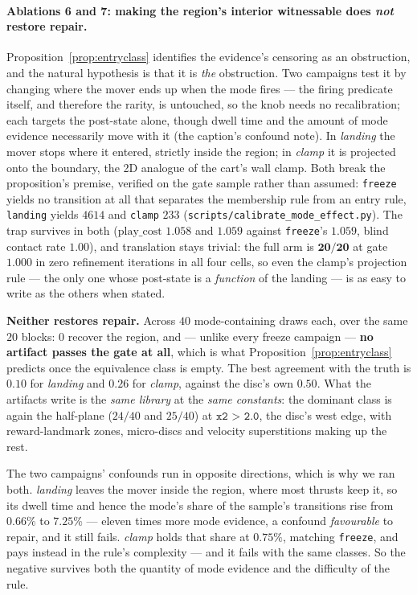 \documentclass[11pt]{article}
\theoremstyle{definition}
\theoremstyle{remark}
\begin{document}
\paragraph{Ablations 6 and 7: making the region's interior witnessable does \emph{not} restore repair.} Proposition~\ref{prop:entryclass} identifies the evidence's censoring as an obstruction, and the natural hypothesis is that it is \emph{the} obstruction. Two campaigns test it by changing where the mover ends up when the mode fires --- the firing predicate itself, and therefore the rarity, is untouched, so the knob needs no recalibration; each targets the post-state alone, though dwell time and the amount of mode evidence necessarily move with it (the caption's confound note). In \emph{landing} the mover stops where it entered, strictly inside the region; in \emph{clamp} it is projected onto the boundary, the 2D analogue of the cart's wall clamp. Both break the proposition's premise, verified on the gate sample rather than assumed: \texttt{freeze} yields no transition at all that separates the membership rule from an entry rule, \texttt{landing} yields $4614$ and \texttt{clamp} $233$ (\texttt{scripts/\allowbreak calibrate\_\allowbreak mode\_\allowbreak effect.py}). The trap survives in both ($\mathrm{play\_cost}$ $1.058$ and $1.059$ against \texttt{freeze}'s $1.059$, blind contact rate $1.00$), and translation stays trivial: the full arm is $\mathbf{20/20}$ at gate $1.000$ in zero refinement iterations in all four cells, so even the clamp's projection rule --- the only one whose post-state is a \emph{function} of the landing --- is as easy to write as the others when stated.

\textbf{Neither restores repair.} Across $40$ mode-containing draws each, over the same $20$ blocks: $0$ recover the region, and --- unlike every freeze campaign --- \textbf{no artifact passes the gate at all}, which is what Proposition~\ref{prop:entryclass} predicts once the equivalence class is empty. The best agreement with the truth is $0.10$ for \emph{landing} and $0.26$ for \emph{clamp}, against the disc's own $0.50$. What the artifacts write is the \emph{same library} at the \emph{same constants}: the dominant class is again the half-plane ($24/40$ and $25/40$) at $\texttt{x2 > 2.0}$, the disc's west edge, with reward-landmark zones, micro-discs and velocity superstitions making up the rest.

The two campaigns' confounds run in opposite directions, which is why we ran both. \emph{landing} leaves the mover inside the region, where most thrusts keep it, so its dwell time and hence the mode's share of the sample's transitions rise from $0.66\%$ to $7.25\%$ --- eleven times more mode evidence, a confound \emph{favourable} to repair, and it still fails. \emph{clamp} holds that share at $0.75\%$, matching \texttt{freeze}, and pays instead in the rule's complexity --- and it fails with the same classes. So the negative survives both the quantity of mode evidence and the difficulty of the rule.
\end{document}
